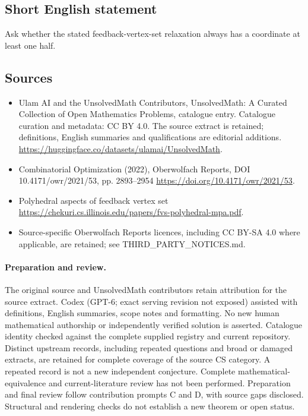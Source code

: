\documentclass[11pt]{article}
\begin{document}
\subsection{Short English statement}
Ask whether the stated feedback-vertex-set relaxation always has a coordinate at least one half.
\subsection{Sources}
\begin{itemize}
\item[\hypertarget{source:statement:1}{S1}] Ulam AI and the UnsolvedMath Contributors, UnsolvedMath: A Curated Collection of Open Mathematics Problems, catalogue entry. Catalogue curation and metadata: CC BY 4.0. The source extract is retained; definitions, English summaries and qualifications are editorial additions.
\url{https://huggingface.co/datasets/ulamai/UnsolvedMath}.
\item[\hypertarget{source:statement:2}{S2}] Combinatorial Optimization (2022), Oberwolfach Reports, DOI 10.4171/owr/2021/53, pp. 2893--2954
\url{https://doi.org/10.4171/owr/2021/53}.
\item[\hypertarget{source:statement:3}{S3}] Polyhedral aspects of feedback vertex set
\url{https://chekuri.cs.illinois.edu/papers/fvs-polyhedral-mpa.pdf}.
\item Source-specific Oberwolfach Reports licences, including CC BY-SA 4.0 where applicable, are retained; see THIRD\_PARTY\_NOTICES.md.
\end{itemize}
\paragraph{Preparation and review.}
The original source and UnsolvedMath contributors retain attribution for the source extract. Codex (GPT-6; exact serving revision not exposed) assisted with definitions, English summaries, scope notes and formatting. No new human mathematical authorship or independently verified solution is asserted. Catalogue identity checked against the complete supplied registry and current repository. Distinct upstream records, including repeated questions and broad or damaged extracts, are retained for complete coverage of the source CS category. A repeated record is not a new independent conjecture. Complete mathematical-equivalence and current-literature review has not been performed. Preparation and final review follow contribution prompts C and D, with source gaps disclosed. Structural and rendering checks do not establish a new theorem or open status.
\label{end:statement}
\end{document}
